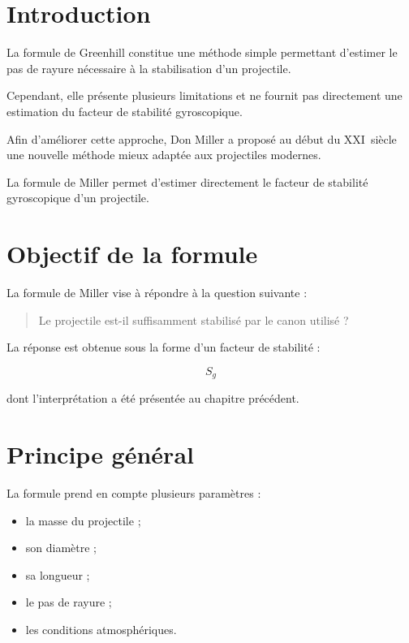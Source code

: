 
\section{Introduction}

La formule de Greenhill constitue une méthode simple permettant d'estimer le
pas de rayure nécessaire à la stabilisation d'un projectile.

Cependant, elle présente plusieurs limitations et ne fournit pas directement
une estimation du facteur de stabilité gyroscopique.

Afin d'améliorer cette approche, Don Miller a proposé au début du XXI\ieme\
siècle une nouvelle méthode mieux adaptée aux projectiles modernes.

\begin{aretenir}

La formule de Miller permet d'estimer directement le facteur de stabilité
gyroscopique d'un projectile.

\end{aretenir}

\section{Objectif de la formule}

La formule de Miller vise à répondre à la question suivante :

\begin{quote}
Le projectile est-il suffisamment stabilisé par le canon utilisé ?
\end{quote}

La réponse est obtenue sous la forme d'un facteur de stabilité :

\begin{equation}
S_g
\end{equation}

dont l'interprétation a été présentée au chapitre précédent.

\section{Principe général}

La formule prend en compte plusieurs paramètres :

\begin{itemize}
    \item la masse du projectile ;
    \item son diamètre ;
    \item sa longueur ;
    \item le pas de rayure ;
    \item les conditions atmosphériques.
\end{itemize}

